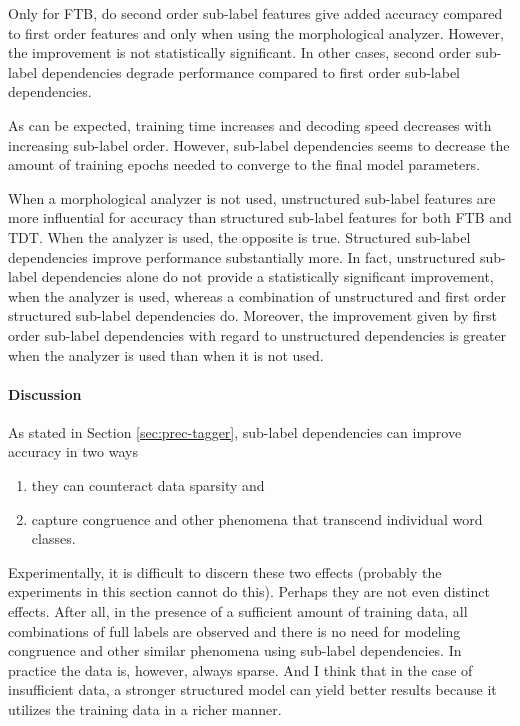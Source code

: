 Only for FTB, do second order sub-label features give added accuracy
compared to first order features and only when using the morphological
analyzer. However, the improvement is not statistically
significant. In other cases, second order sub-label dependencies
degrade performance compared to first order sub-label dependencies.

As can be expected, training time increases and decoding speed
decreases with increasing sub-label order. However, sub-label
dependencies seems to decrease the amount of training epochs needed to
converge to the final model parameters.

When a morphological analyzer is not used, unstructured sub-label
features are more influential for accuracy than structured sub-label
features for both FTB and TDT.  When the analyzer is used, the
opposite is true. Structured sub-label dependencies improve
performance substantially more. In fact, unstructured sub-label
dependencies alone do not provide a statistically significant
improvement, when the analyzer is used, whereas a combination of
unstructured and first order structured sub-label dependencies
do. Moreover, the improvement given by first order sub-label
dependencies with regard to unstructured dependencies is greater when
the analyzer is used than when it is not used.

\paragraph{Discussion} As stated in Section \ref{sec:prec-tagger}, sub-label dependencies can improve accuracy in two ways
\begin{enumerate}
\item they can counteract data sparsity and
\item capture congruence and other phenomena that transcend individual
  word classes.
\end{enumerate}
Experimentally, it is difficult to discern these two effects (probably
the experiments in this section cannot do this). Perhaps they are not
even distinct effects. After all, in the presence of a sufficient
amount of training data, all combinations of full labels are observed
and there is no need for modeling congruence and other similar
phenomena using sub-label dependencies. In practice the data is,
however, always sparse. And I think that in the case of insufficient
data, a stronger structured model can yield better results because it
utilizes the training data in a richer manner.

